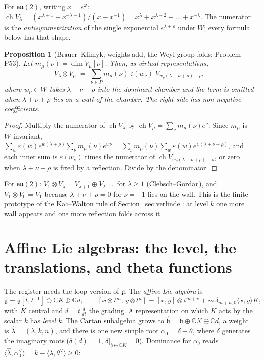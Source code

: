 \documentclass[11pt]{article}
\newtheorem{proposition}[theorem]{Proposition}
\theoremstyle{definition}
\theoremstyle{remark}
\newcommand{\C}{\mathbb{C}}
\begin{document}
For $\mathfrak{su}(2)$, writing $x = e^{\omega}$:
$\operatorname{ch}V_\lambda = (x^{\lambda+1}-x^{-\lambda-1})/(x-x^{-1})
= x^{\lambda}+x^{\lambda-2}+\dots+x^{-\lambda}$. The numerator is the
\emph{antisymmetrization} of the single exponential $e^{\lambda+\rho}$
under $W$; every formula below has that shape.

\begin{proposition}[Brauer--Klimyk; weights add, the Weyl group folds; Problem P53]
\label{prop:klimyk}
Let $m_\mu(\nu) = \dim V_\mu[\nu]$. Then, as virtual representations,
\[
  V_\lambda\otimes V_\mu \;=\; \sum_{\nu\in P}m_\mu(\nu)\;\varepsilon(w_\nu)\;V_{w_\nu(\lambda+\nu+\rho)-\rho},
\]
where $w_\nu\in W$ takes $\lambda+\nu+\rho$ into the dominant chamber and
the term is omitted when $\lambda+\nu+\rho$ lies on a wall of the chamber.
The right side has non-negative coefficients.
\end{proposition}

\begin{proof}
Multiply the numerator of $\operatorname{ch}V_\lambda$ by
$\operatorname{ch}V_\mu = \sum_\nu m_\mu(\nu)e^{\nu}$. Since $m_\mu$ is
$W$-invariant,
$\sum_w\varepsilon(w)e^{w(\lambda+\rho)}\sum_\nu m_\mu(\nu)e^{w\nu}
= \sum_\nu m_\mu(\nu)\sum_w\varepsilon(w)e^{w(\lambda+\nu+\rho)}$, and each
inner sum is $\varepsilon(w_\nu)$ times the numerator of
$\operatorname{ch}V_{w_\nu(\lambda+\nu+\rho)-\rho}$, or zero when
$\lambda+\nu+\rho$ is fixed by a reflection. Divide by the denominator.
\end{proof}

For $\mathfrak{su}(2)$: $V_1\otimes V_\lambda = V_{\lambda+1}\oplus V_{\lambda-1}$
for $\lambda\ge1$ (Clebsch--Gordan), and $V_1\otimes V_0 = V_1$ because
$\lambda+\nu+\rho = 0$ for $\nu = -1$ lies on the wall. This is the finite
prototype of the Kac--Walton rule of Section~\ref{sec:verlinde}: at level
$k$ one more wall appears and one more reflection folds across it.

\section{Affine Lie algebras: the level, the translations, and theta functions}\label{sec:affine}

The register needs the loop version of $\mathfrak g$. The \emph{affine Lie
algebra} is
\[
  \hat{\mathfrak g} = \mathfrak g[t,t^{-1}]\oplus\C K\oplus\C d,\qquad
  [x\otimes t^m,\,y\otimes t^n] = [x,y]\otimes t^{m+n} + m\,\delta_{m+n,0}\langle x,y\rangle K,
\]
with $K$ central and $d = t\,\tfrac{d}{dt}$ the grading. A representation
on which $K$ acts by the scalar $k$ has \emph{level} $k$. The Cartan
subalgebra grows to $\hat{\mathfrak h} = \mathfrak h\oplus\C K\oplus\C d$,
a weight is $\hat\lambda = (\lambda,k,n)$, and there is one new simple root
$\alpha_0 = \delta-\theta$, where $\delta$ generates the imaginary roots
($\delta(d) = 1$, $\delta|_{\mathfrak h\oplus\C K} = 0$). Dominance for
$\alpha_0$ reads $\langle\hat\lambda,\alpha_0^\vee\rangle = k-\langle\lambda,\theta^\vee\rangle\ge0$:
\end{document}
